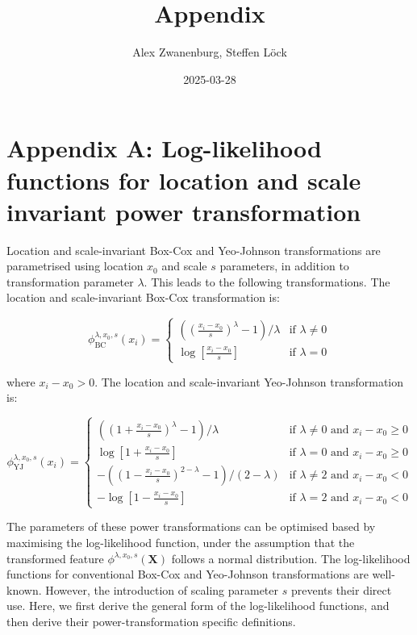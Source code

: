\documentclass[
  a4paper,
]{article}
\title{Appendix}
\author{Alex Zwanenburg, Steffen Löck}
\date{2025-03-28}
\begin{document}
\maketitle

\section{Appendix A: Log-likelihood functions for location and scale
invariant power
transformation}\label{appendix-a-log-likelihood-functions-for-location-and-scale-invariant-power-transformation}

Location and scale-invariant Box-Cox and Yeo-Johnson transformations are
parametrised using location \(x_0\) and scale \(s\) parameters, in
addition to transformation parameter \(\lambda\). This leads to the
following transformations. The location and scale-invariant Box-Cox
transformation is:

\begin{equation}
\phi_{\text{BC}}^{\lambda, x_0, s} (x_i) = 
\begin{cases}
\left( \left(\frac{x_i - x_0}{s} \right)^\lambda - 1 \right) / \lambda & \text{if } \lambda \neq 0\\
\log\left[\frac{x_i - x_0}{s}\right] & \text{if } \lambda = 0
\end{cases}
\end{equation}

where \(x_i - x_0 > 0\). The location and scale-invariant Yeo-Johnson
transformation is:

\begin{equation}
\phi_{\text{YJ}}^{\lambda, x_0, s} (x_i) = 
\begin{cases}
\left( \left( 1 + \frac{x_i - x_0}{s}\right)^\lambda - 1\right) / \lambda & \text{if } \lambda \neq 0 \text{ and } x_i - x_0 \geq 0\\
\log\left[1 + \frac{x_i - x_0}{s}\right] & \text{if } \lambda = 0 \text{ and } x_i - x_0 \geq 0\\
-\left( \left( 1 - \frac{x_i - x_0}{s}\right)^{2 - \lambda} - 1 \right) / \left(2 - \lambda \right) & \text{if } \lambda \neq 2 \text{ and } x_i - x_0 < 0\\
-\log\left[1 - \frac{x_i - x_0}{s}\right] & \text{if } \lambda = 2 \text{ and } x_i - x_0 < 0
\end{cases}
\end{equation}

The parameters of these power transformations can be optimised based by
maximising the log-likelihood function, under the assumption that the
transformed feature \(\phi^{\lambda, x_0, s} (\mathbf{X})\) follows a
normal distribution. The log-likelihood functions for conventional
Box-Cox and Yeo-Johnson transformations are well-known. However, the
introduction of scaling parameter \(s\) prevents their direct use. Here,
we first derive the general form of the log-likelihood functions, and
then derive their power-transformation specific definitions.
\end{document}
